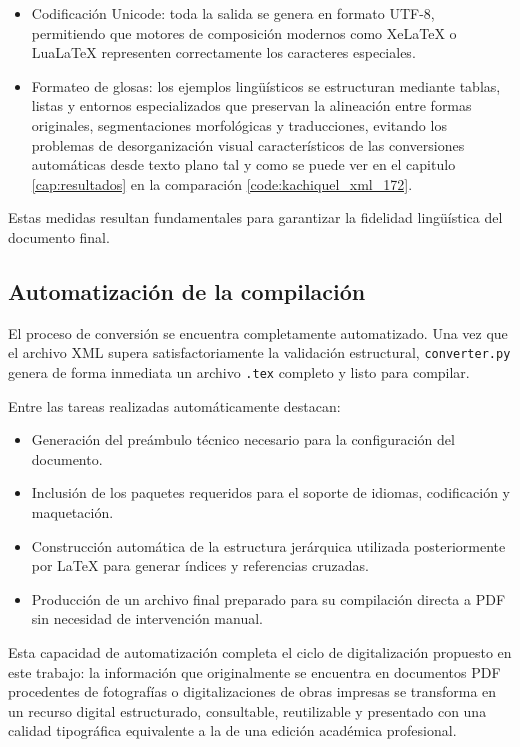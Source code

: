 \begin{itemize}
    \item Codificación Unicode: toda la salida se genera en formato UTF-8, permitiendo que motores de composición modernos como XeLaTeX o LuaLaTeX representen correctamente los caracteres especiales.

    \item Formateo de glosas: los ejemplos lingüísticos se estructuran mediante tablas, listas y entornos especializados que preservan la alineación entre formas originales, segmentaciones morfológicas y traducciones, evitando los problemas de desorganización visual característicos de las conversiones automáticas desde texto plano tal y como se puede ver en el capitulo \ref{cap:resultados} en la comparación \ref{code:kachiquel_xml_172}.
\end{itemize}

Estas medidas resultan fundamentales para garantizar la fidelidad lingüística del documento final.

\subsection{Automatización de la compilación}

El proceso de conversión se encuentra completamente automatizado. Una vez que el archivo XML supera satisfactoriamente la validación estructural, \texttt{converter.py} genera de forma inmediata un archivo \texttt{.tex} completo y listo para compilar.

Entre las tareas realizadas automáticamente destacan:

\begin{itemize}
    \item Generación del preámbulo técnico necesario para la configuración del documento.

    \item Inclusión de los paquetes requeridos para el soporte de idiomas, codificación y maquetación.

    \item Construcción automática de la estructura jerárquica utilizada posteriormente por \LaTeX{} para generar índices y referencias cruzadas.

    \item Producción de un archivo final preparado para su compilación directa a PDF sin necesidad de intervención manual.
\end{itemize}

Esta capacidad de automatización completa el ciclo de digitalización propuesto en este trabajo: la información que originalmente se encuentra en documentos PDF procedentes de fotografías o digitalizaciones de obras impresas se transforma en un recurso digital estructurado, consultable, reutilizable y presentado con una calidad tipográfica equivalente a la de una edición académica profesional.






